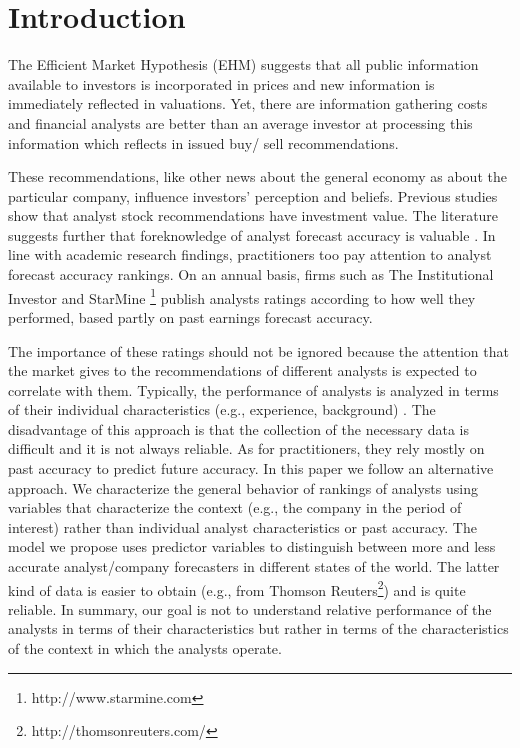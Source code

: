 \section{Introduction}
\label{sec:introduction}

The Efficient Market Hypothesis (EHM) \citep{fama1970ecm} suggests that all public information available to investors is incorporated in prices and new information is immediately reflected in valuations. Yet, there are information gathering costs and financial analysts are better than an average investor at processing this information which reflects in issued buy/ sell recommendations. 

These recommendations, like other news about the general economy as about the particular company, influence investors' perception and beliefs. Previous studies show that analyst stock recommendations have investment value. The literature suggests further that foreknowledge of analyst forecast accuracy is valuable \citep{brown2003}. In line with academic research findings, practitioners too pay attention to analyst forecast accuracy rankings. On an annual basis, firms such as The Institutional Investor and StarMine \footnote{http://www.starmine.com} publish analysts ratings according to how well they performed, based partly on past earnings forecast accuracy. 

The importance of these ratings should not be ignored because the attention that the market gives to the recommendations of different analysts is expected to correlate with them. Typically, the performance of analysts is analyzed in terms of their individual characteristics (e.g., experience, background) \citep{clement1999}. The disadvantage of this approach is that the collection of the necessary data is difficult and it is not always reliable. As for practitioners, they rely mostly on past accuracy to predict future accuracy. In this paper we follow an alternative approach. We characterize the general behavior of rankings of analysts using variables that characterize the context (e.g., the company in the period of interest) rather than individual analyst characteristics or past accuracy. The model we propose uses predictor variables to distinguish between more and less accurate analyst/company forecasters in different states of the world. The latter kind of data is easier to obtain (e.g., from Thomson Reuters\footnote{http://thomsonreuters.com/}) and is quite reliable. In summary, our goal is not to understand  relative performance of the analysts  in terms of their characteristics but rather in terms of the characteristics of the context in which the analysts operate.



